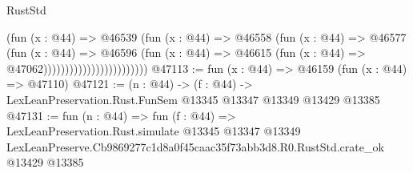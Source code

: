 \begin{lexlean}{RustStd}
\begin{coremodule}
                                        (fun (x : @44) =>
                                        @46539
                                          (fun (x : @44) =>
                                          @46558
                                            (fun (x : @44) =>
                                            @46577
                                              (fun (x : @44) =>
                                              @46596
                                                (fun (x : @44) =>
                                                @46615
                                                  (fun (x : @44) => @47062))))))))))))))))))))))))
@47113 := fun (x : @44) => @46159 (fun (x : @44) => @47110)
@47121 := (n : @44) ->
  (f : @44) -> LexLeanPreservation.Rust.FunSem @13345 @13347 @13349 @13429 @13385
@47131 := fun (n : @44) =>
  fun (f : @44) =>
  LexLeanPreservation.Rust.simulate
    @13345
    @13347
    @13349
    LexLeanPreserve.Cb9869277c1d8a0f45caac35f73abb3d8.R0.RustStd.crate_ok
    @13429
    @13385
\end{coremodule}
\end{lexlean}
